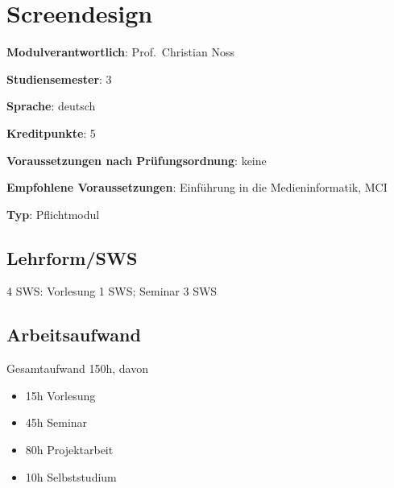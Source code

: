 \chapter{Screendesign\label{/mi-2017/modulbeschreibungen-bachelor/BA_Screendesign}}\label{screendesignpathlabelmi-2017modulbeschreibungen-bachelorbaux5fscreendesign}

\begin{modulHead}
\textbf{Modulverantwortlich}: Prof.~Christian
Noss
\end{modulHead}
\begin{modulHead}
\textbf{Studiensemester}:
3
\end{modulHead}
\begin{modulHead}
\textbf{Sprache}:
deutsch
\end{modulHead}
\begin{modulHead}
\textbf{Kreditpunkte}:
5
\end{modulHead}
\begin{modulHead}
\textbf{Voraussetzungen nach
Prüfungsordnung}:
keine
\end{modulHead}
\begin{modulHead}
\textbf{Empfohlene
Voraussetzungen}: Einführung in die Medieninformatik,
MCI
\end{modulHead}
\begin{modulHead}
\textbf{Typ}:
Pflichtmodul
\end{modulHead}


\section*{Lehrform/SWS\label{/mi-2017/modulbeschreibungen-bachelor/BA_Screendesign}}\label{lehrformswspathlabelmi-2017modulbeschreibungen-bachelorbaux5fscreendesign}

4 SWS: Vorlesung 1 SWS; Seminar 3 SWS

\section*{Arbeitsaufwand\label{/mi-2017/modulbeschreibungen-bachelor/BA_Screendesign}}\label{arbeitsaufwandpathlabelmi-2017modulbeschreibungen-bachelorbaux5fscreendesign}

Gesamtaufwand 150h, davon

\begin{itemize}
\tightlist
\item
  15h Vorlesung
\item
  45h Seminar
\item
  80h Projektarbeit
\item
  10h Selbststudium
\end{itemize}

